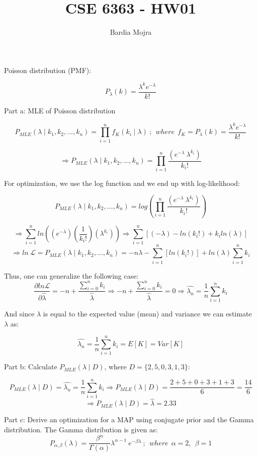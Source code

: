 \documentclass{homeworg}
\title{CSE 6363 - HW01}
\author{Bardia Mojra}
\begin{document}
\maketitle

\exercise

Poisson distribution (PMF):

$$
P_{\lambda}(k) = \frac{\lambda^{k} e^{- \lambda}}{k!}
$$

Part a: MLE of Poisson distribution

$$
P_{MLE}(\lambda \mid k_1, k_2, ..., k_n) = \prod_{i = 1}^{n}f_K(k_i \mid \lambda)~
; ~~ where ~~ f_K = P_{\lambda}(k) = \frac{\lambda^{k} e^{- \lambda}}{k!}
$$

$$
\Rightarrow P_{MLE}(\lambda \mid k_1, k_2, ..., k_n) =  \prod_{i = 1}^{n}
\frac{(e^{- \lambda}~\lambda^{k_i})}{k_i!}
$$

For optimization, we use the log function and we end up with log-likelihood:

$$
P_{MLE}(\lambda \mid k_1, k_2, ..., k_n) =  log (\prod_{i = 1}^{n}
\frac{(e^{- \lambda}~\lambda^{k_i})}{k_i!} )
$$

$$
\Rightarrow \sum_{i=1}^{n} ln((e^{- \lambda})(\frac{1}{k_i!})(\lambda^{k_i}))
\Rightarrow \sum_{i=1}^{n}[ (- \lambda) - ln(k_i!) + k_i ln(\lambda)]
$$
$$
\Rightarrow ln ~\mathcal{L} =
P_{MLE}(\lambda \mid k_1, k_2, ..., k_n) =
-n\lambda - \sum_{i=1}^{n}[ln(k_i!)] + ln(\lambda)\sum_{i=1}^{n}k_i
$$

Thus, one can generalize the following case:
$$
\frac{\partial ln \mathcal{L} }{\partial \hat{\lambda}}
= -n + \frac{\sum_{i=0}^{n} k_i }{\hat{\lambda}}
\Rightarrow -n + \frac{\sum_{i=0}^{n} k_i }{\hat{\lambda}} = 0
\Rightarrow
\hat{\lambda_n} = \frac{1}{n} \sum_{i=1}^{n} k_i
$$

And since $\lambda$ is equal to the expected value (mean) and variance we can
estimate $\lambda$ as:

$$
\hat{\lambda_n} = \frac{1}{n} \sum_{i=1}^{n} k_i = E[K]= Var[K]
$$

\newpage
Part b: Calculate $P_{MLE}(\lambda \mid D)$, where $D=\{2,5,0,3,1,3\}$:

$$
P_{MLE}(\lambda \mid D) = \hat{\lambda_n} = \frac{1}{n} \sum_{i=1}^{n} k_i
\Rightarrow P_{MLE}(\lambda \mid D) = \frac{2+5+0+3+1+3}{6} = \frac{14}{6}
$$
$$
\Rightarrow
P_{MLE}(\lambda \mid D)
= \hat{\lambda} = 2.33
$$

Part c: Derive an optimization for a MAP using conjugate prior and the Gamma
distribution. The Gamma distribution is given as:
$$
P_{\alpha, \beta}(\lambda) = \frac{\beta^{\alpha}}{\Gamma(\alpha)} \lambda^{\alpha - 1}~e^{- \beta \lambda}
~;~~where ~~\alpha= 2, ~~\beta=1
$$
\end{document}
